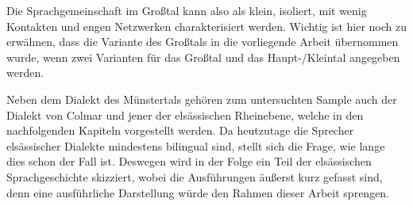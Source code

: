 Die Sprachgemeinschaft im Großtal kann also als klein, isoliert, mit wenig Kontakten und engen Netzwerken charakterisiert werden. Wichtig ist hier noch zu erwähnen, dass die Variante des Großtals in die vorliegende Arbeit übernommen wurde, wenn zwei Varianten für das Großtal und das Haupt-/Kleintal angegeben werden.

Neben dem Dialekt des Münstertals gehören zum untersuchten Sample auch der Dialekt von Colmar und jener der elsässischen Rheinebene, welche in den nachfolgenden Kapiteln vorgestellt werden. Da heutzutage die Sprecher elsässischer Dialekte mindestens bilingual sind, stellt sich die Frage, wie lange dies schon der Fall ist. Deswegen wird in der Folge ein Teil der elsässischen Sprachgeschichte skizziert, wobei die Ausführungen äußerst kurz gefasst sind, denn eine ausführliche Darstellung würde den Rahmen dieser Arbeit sprengen.

